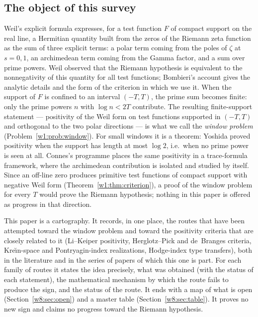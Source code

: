 \documentclass[11pt]{amsart}
\theoremstyle{definition}
\theoremstyle{remark}
\numberwithin{equation}{section}
\begin{document}
\subsection{The object of this survey}
Weil's explicit formula \cite{Weil52} expresses, for a test function $F$ of
compact support on the real line, a Hermitian quantity built from the zeros of
the Riemann zeta function as the sum of three explicit terms: a polar term
coming from the poles of $\zeta$ at $s=0,1$, an archimedean term coming from
the Gamma factor, and a sum over prime powers. Weil observed that the
Riemann hypothesis is equivalent to the nonnegativity of this quantity for
all test functions; Bombieri's account \cite{Bombieri2000} gives the analytic
details and the form of the criterion in which we use it. When the support of
$F$ is confined to an interval $(-T,T)$, the prime sum becomes finite: only
the prime powers $n$ with $\log n<2T$ contribute. The resulting finite-support
statement --- positivity of the Weil form on test functions supported in
$(-T,T)$ and orthogonal to the two polar directions --- is what we call the
\emph{window problem} (Problem~\ref{w1:prob:window}). For small windows it is
a theorem: Yoshida \cite{Yoshida1992} proved positivity when the support has
length at most $\log 2$, i.e.\ when no prime power is seen at all. Connes's
programme \cite{Connes1999,ConnesConsani2021} places the same positivity in a
trace-formula framework, where the archimedean contribution is isolated and
studied by itself. Since an off-line zero produces primitive test functions of
compact support with negative Weil form (Theorem~\ref{w1:thm:criterion}), a
proof of the window problem for every $T$ would prove the Riemann hypothesis;
nothing in this paper is offered as progress in that direction.

This paper is a cartography. It records, in one place, the routes that have
been attempted toward the window problem and toward the positivity criteria
that are closely related to it (Li--Keiper positivity, Herglotz--Pick and
de~Branges criteria, Kre\u{\i}n-space and Pontryagin-index realizations,
Hodge-index type transfers), both in the literature and in the series of
papers of which this one is part. For each family of routes it states the
idea precisely, what was obtained (with the status of each statement), the
mathematical mechanism by which the route fails to produce the sign, and the
status of the route. It ends with a map of what is open
(Section~\ref{w8:sec:open}) and a master table (Section~\ref{w8:sec:table}).
It proves no new sign and claims no progress toward the Riemann hypothesis.
\end{document}

